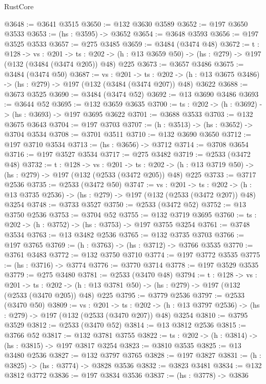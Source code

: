 \begin{lexlean}{RustCore}
\begin{coremodule}
@3648 := @3641 @3515
@3650 := @132 @3630 @3589
@3652 := @197 @3650 @3533
@3653 := (hs : @3595) -> @3652
@3654 := @3648 @3593
@3656 := @197 @3525 @3533
@3657 := @275 @3485
@3659 := @3484 (@3474 @48)
@3672 := {t : @128} ->
  {vs : @201} ->
  {ts : @202} -> (h : @13 @3659 @50) -> (hs : @279) -> @197 (@132 (@3484 (@3474 @205)) @48) @225
@3673 := @3657 @3486
@3675 := @3484 (@3474 @50)
@3687 := {vs : @201} ->
  {ts : @202} -> (h : @13 @3675 @3486) -> (hs : @279) -> @197 (@132 (@3484 (@3474 @207)) @48) @3622
@3688 := @3673 @3525
@3690 := @3484 (@3474 @52)
@3692 := @13 @3690 @3486
@3693 := @3644 @52
@3695 := @132 @3659 @3635
@3700 := {ts : @202} -> (h : @3692) -> (hs : @3693) -> @197 @3695 @3622
@3701 := @3688 @3533
@3703 := @132 @3675 @3643
@3704 := @197 @3703
@3707 := (h : @3513) -> (hs : @3652) -> @3704 @3534
@3708 := @3701 @3511
@3710 := @132 @3690 @3650
@3712 := @197 @3710 @3534
@3713 := (hs : @3656) -> @3712
@3714 := @3708 @3654
@3716 := @197 @3527 @3534
@3717 := @275 @3482
@3719 := @2533 (@3472 @48)
@3732 := {t : @128} ->
  {vs : @201} ->
  {ts : @202} -> (h : @13 @3719 @50) -> (hs : @279) -> @197 (@132 (@2533 (@3472 @205)) @48) @225
@3733 := @3717 @2536
@3735 := @2533 (@3472 @50)
@3747 := {vs : @201} ->
  {ts : @202} -> (h : @13 @3735 @2536) -> (hs : @279) -> @197 (@132 (@2533 (@3472 @207)) @48) @3254
@3748 := @3733 @3527
@3750 := @2533 (@3472 @52)
@3752 := @13 @3750 @2536
@3753 := @3704 @52
@3755 := @132 @3719 @3695
@3760 := {ts : @202} -> (h : @3752) -> (hs : @3753) -> @197 @3755 @3254
@3761 := @3748 @3534
@3763 := @13 @3482 @2536
@3765 := @132 @3735 @3703
@3766 := @197 @3765
@3769 := (h : @3763) -> (hs : @3712) -> @3766 @3535
@3770 := @3761 @3483
@3772 := @132 @3750 @3710
@3774 := @197 @3772 @3535
@3775 := (hs : @3716) -> @3774
@3776 := @3770 @3714
@3778 := @197 @3529 @3535
@3779 := @275 @3480
@3781 := @2533 (@3470 @48)
@3794 := {t : @128} ->
  {vs : @201} ->
  {ts : @202} -> (h : @13 @3781 @50) -> (hs : @279) -> @197 (@132 (@2533 (@3470 @205)) @48) @225
@3795 := @3779 @2536
@3797 := @2533 (@3470 @50)
@3809 := {vs : @201} ->
  {ts : @202} -> (h : @13 @3797 @2536) -> (hs : @279) -> @197 (@132 (@2533 (@3470 @207)) @48) @3254
@3810 := @3795 @3529
@3812 := @2533 (@3470 @52)
@3814 := @13 @3812 @2536
@3815 := @3766 @52
@3817 := @132 @3781 @3755
@3822 := {ts : @202} -> (h : @3814) -> (hs : @3815) -> @197 @3817 @3254
@3823 := @3810 @3535
@3825 := @13 @3480 @2536
@3827 := @132 @3797 @3765
@3828 := @197 @3827
@3831 := (h : @3825) -> (hs : @3774) -> @3828 @3536
@3832 := @3823 @3481
@3834 := @132 @3812 @3772
@3836 := @197 @3834 @3536
@3837 := (hs : @3778) -> @3836

\end{coremodule}
\end{lexlean}
